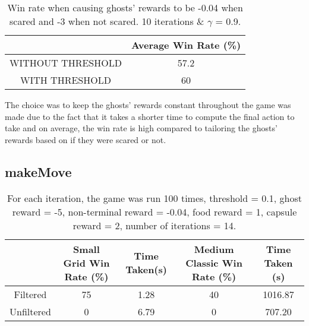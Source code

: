 \documentclass[12pt]{report}
\begin{document}
        \begin{table}[h!]
          \begin{center}
            \begin{tabular}{c|c}
              \textbf{} & \textbf{Average Win Rate (\%)} \\
              \hline
              WITHOUT THRESHOLD & 57.2\\
              WITH THRESHOLD & 60\\
            \end{tabular}
            \caption{Win rate when causing ghosts' rewards to be -0.04 when scared and -3 when not scared. 10 iterations \& $\gamma$ = 0.9.}
            \label{tab:table4}
          \end{center}
        \end{table}

          The choice was to keep the ghosts' rewards constant throughout the game was made due to the fact that it takes a shorter time to compute the final action to take and on average, the win rate is high compared to tailoring the ghosts' rewards based on if they were scared or not.

      \subsection*{makeMove}
        \begin{table}[H]
          \begin{center}
            \begin{adjustbox}{max width=\textwidth}
            \begin{tabular}{*{5}{|c}|}

              \textbf{} & \textbf{Small Grid Win Rate (\%)} & \textbf{Time Taken(s)} & \textbf{Medium Classic Win Rate (\%)} & \textbf{Time Taken (s)}\\
              \hline
                    Filtered & 75 & 1.28 & 40 & 1016.87\\
                    Unfiltered & 0 & 6.79 & 0 & 707.20\\

            \end{tabular}
            \end{adjustbox}
            \caption{For each iteration, the game was run 100 times, threshold = 0.1, ghost reward = -5, non-terminal reward = -0.04, food reward = 1, capsule reward = 2, number of iterations = 14.}
            \label{tab:table4}
          \end{center}
        \end{table}
\end{document}
